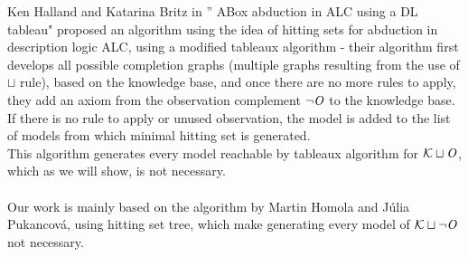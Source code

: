 Ken Halland and Katarina Britz in '' ABox abduction in ALC using a DL tableau" \cite{halland2012} proposed an algorithm using the idea of hitting sets for abduction in description logic ALC, using a modified tableaux algorithm - their algorithm first develops all possible completion graphs (multiple graphs resulting from the use of $\sqcup$ rule), based on the knowledge base, and once there are no more rules to apply, they add an axiom from the observation complement $\neg \mathit{O}$ to the knowledge base. If there is no rule to apply or unused observation, the model is added to the list of models from which minimal hitting set is generated. \\ This algorithm generates every model reachable by tableaux algorithm for $\mathcal{K} \sqcup \mathit{O}$, which as we will show, is not necessary. \\ \\
Our work is mainly based on the algorithm by Martin Homola and Júlia Pukancová, using hitting set tree, which make generating every model of $\mathcal{K} \sqcup \neg \mathit{O}$ not necessary.




